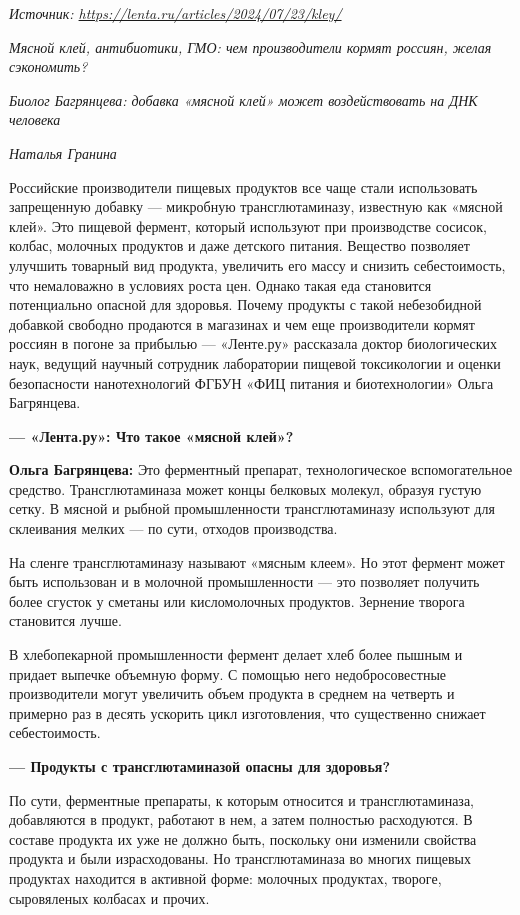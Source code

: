 \textit{Источник: \url{https://lenta.ru/articles/2024/07/23/kley/}}

\textit{Мясной клей, антибиотики, ГМО: чем производители кормят россиян, желая сэкономить?}

\textit{Биолог Багрянцева: добавка «мясной клей» может воздействовать на ДНК человека}

\textit{Наталья Гранина}

Российские производители пищевых продуктов все чаще стали использовать
запрещенную добавку --- микробную трансглютаминазу, известную как «мясной клей».
Это пищевой фермент, который используют при производстве сосисок, колбас, молочных
продуктов и даже детского питания. Вещество позволяет улучшить товарный вид продукта,
увеличить его массу и снизить себестоимость, что немаловажно в условиях роста цен.
Однако такая еда становится потенциально опасной для здоровья.
Почему продукты с такой небезобидной добавкой свободно продаются в
магазинах и чем еще производители кормят россиян в погоне за прибылью ---
«Ленте.ру» рассказала доктор биологических наук, ведущий научный сотрудник
лаборатории пищевой токсикологии и оценки безопасности нанотехнологий ФГБУН
«ФИЦ питания и биотехнологии» Ольга Багрянцева.

\textbf{--- «Лента.ру»: Что такое «мясной клей»?}

\textbf{Ольга Багрянцева:} Это ферментный препарат, технологическое
вспомогательное средство. Трансглютаминаза может
концы белковых молекул, образуя густую сетку.
В мясной и рыбной промышленности трансглютаминазу используют
для склеивания мелких 
--- по сути, отходов производства.

На сленге трансглютаминазу называют «мясным клеем».
Но этот фермент может быть использован и в молочной промышленности
--- это позволяет получить более  сгусток
у сметаны или кисломолочных продуктов. Зернение творога становится
лучше.

В хлебопекарной промышленности фермент делает хлеб более пышным
и придает выпечке объемную форму. С помощью него недобросовестные
производители могут увеличить объем продукта в среднем на четверть
и примерно раз в десять ускорить цикл изготовления, что существенно
снижает себестоимость.

\textbf{--- Продукты с трансглютаминазой опасны для здоровья?}

По сути, ферментные препараты, к которым относится и трансглютаминаза,
добавляются в продукт, работают в нем, а затем полностью расходуются.
В составе продукта их уже не должно быть, поскольку они изменили
свойства продукта и были израсходованы. Но трансглютаминаза во
многих пищевых продуктах находится в активной форме: молочных
продуктах, твороге, сыровяленых колбасах и прочих.

